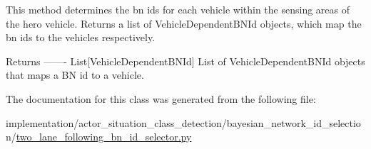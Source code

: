 \begin{DoxyVerb}This method determines the bn ids for each vehicle within the sensing areas of the hero vehicle.
Returns a list of VehicleDependentBNId objects, which map the bn ids to the vehicles respectively.

Returns
-------
List[VehicleDependentBNId]
    List of VehicleDependentBNId objects that maps a BN id to a vehicle.
\end{DoxyVerb}
 

The documentation for this class was generated from the following file\+:\begin{DoxyCompactItemize}
\item 
implementation/actor\+\_\+situation\+\_\+class\+\_\+detection/bayesian\+\_\+network\+\_\+id\+\_\+selection/\hyperlink{two__lane__following__bn__id__selector_8py}{two\+\_\+lane\+\_\+following\+\_\+bn\+\_\+id\+\_\+selector.\+py}\end{DoxyCompactItemize}
